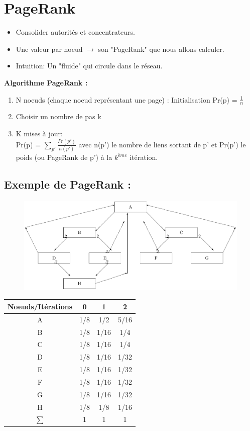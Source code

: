 \section{PageRank}
\begin{itemize}
\item Consolider autorités et concentrateurs.
\item Une valeur par noeud $ \rightarrow $ son "PageRank" que nous allons calculer. 
\item Intuition: Un "fluide" qui circule dans le réseau. 
\end{itemize}
\textbf{ Algorithme PageRank :}
\begin{enumerate}
\item N noeuds (chaque noeud représentant une page) : Initialisation Pr(p) =  $\frac{1}{n}$
\item Choisir un nombre de pas k
\item K mises à jour:\\
Pr(p) = $ \sum_ {p'}\frac{Pr(p')}{n(p')} $ avec n(p') le nombre de liens sortant de p' et Pr(p') le poids (ou PageRank de p') à la $k^{ème}$ itération.
\end{enumerate}
\subsection*{Exemple de PageRank :}

\begin{figure}[h!]
\centering
 \includegraphics[scale=0.8]{images/24_imagePr.pdf}
\label{graphPageRank}
\end{figure}

 
 	\begin{tabular}{|c| c |c |c |}
		\hline
		Noeuds/Itérations & 0 & 1 & 2 \\
		\hline
		A & 1/8 & 1/2 & 5/16 \\
		B & 1/8 & 1/16 &  1/4   \\
		C & 1/8 & 1/16 & 1/4    \\
		D & 1/8 & 1/16 & 1/32  \\
		E & 1/8 & 1/16 &  1/32   \\
		F & 1/8 & 1/16 & 1/32    \\
		G & 1/8 & 1/16 & 1/32    \\
		H & 1/8 & 1/8 &  1/16   \\
		\hline
		$\sum $ & 1 & 1 & 1 \\
		\hline
	\end{tabular}


